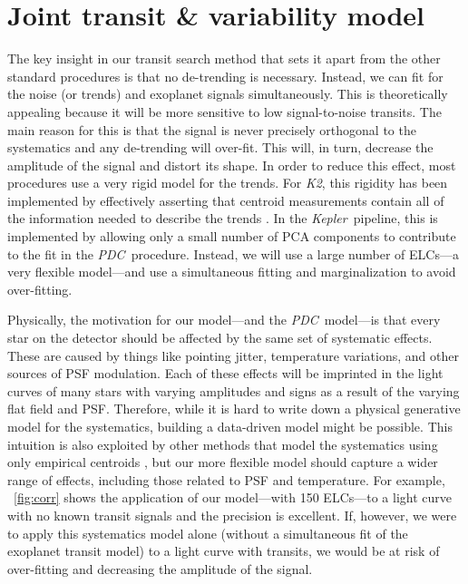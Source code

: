 \documentclass[12pt,preprint]{aastex}
\newcommand{\project}[1]{\textsl{#1}} %
\newcommand{\kepler}{\project{Kepler}}
\newcommand{\KT}{\project{K2}}
\newcommand{\pdc}{\project{PDC}}
\newcommand{\figref}[1]{\ref{fig:#1}}
\newcommand{\Fig}[1]{\figurename~\figref{#1}}
\newcommand{\sectlabel}[1]{\label{sect:#1}}
\begin{document}
\section{Joint transit \& variability model}
\sectlabel{model}

The key insight in our transit search method that sets it apart from the
other standard procedures is that no de-trending is necessary.
Instead, we can fit for the noise (or trends) and exoplanet signals simultaneously.
This is theoretically appealing because it will be more sensitive to low
signal-to-noise transits.
The main reason for this is that the signal is never precisely orthogonal to the
systematics and any de-trending will over-fit.
This will, in turn, decrease the amplitude of the
signal and distort its shape.
In order to reduce this effect, most procedures use a very rigid model for
the trends.
For \KT, this rigidity has been implemented by
effectively asserting that centroid measurements contain
all of the information needed to describe the trends \citep{Vanderburg:2014,
Aigrain:2015, Crossfield:2015}.
In the \kepler\ pipeline, this is implemented by allowing only a small number
of PCA components to contribute to the fit in the \pdc\ procedure.
Instead, we will use a large number of ELCs---a very flexible model---and
use a simultaneous fitting and marginalization to avoid over-fitting.

Physically, the motivation for our model---and the \pdc\ model---is that every
star on the detector should be affected by the same set of systematic effects.
These are caused by things like pointing jitter, temperature variations, and
other sources of PSF modulation.
Each of these effects will be imprinted in the light
curves of many stars with varying amplitudes and signs as a result of the
varying flat field and PSF.
Therefore, while it is hard to write down a physical generative model for the
systematics, building a data-driven model might be possible.
This intuition is also exploited by other methods that model the systematics
using only empirical centroids \citep{Vanderburg:2014, Armstrong:2014,
Aigrain:2015,
Crossfield:2015}, but our more flexible model should capture a wider range of
effects, including those related to PSF and temperature.
For example, \Fig{corr} shows the application of our model---with 150
ELCs---to a light curve with no known transit signals and the precision is
excellent.
If, however, we were to apply this systematics model alone (without a simultaneous fit
of the exoplanet transit model) to a light curve with
transits, we would be at risk of over-fitting and decreasing the amplitude of
the signal.
\end{document}
